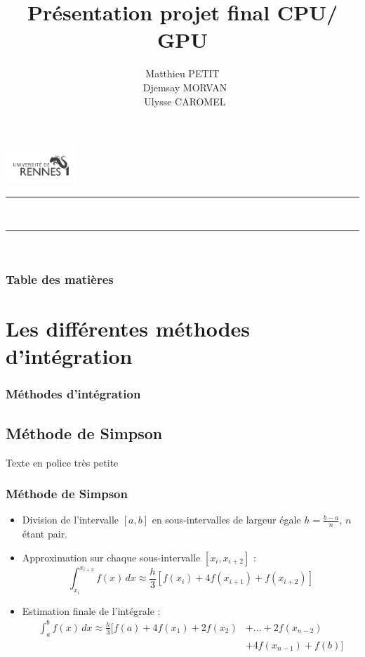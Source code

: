 \documentclass[10pt]{beamer}
\title{Présentation projet final CPU/ GPU}
\author{Matthieu PETIT \\ Djemsay MORVAN \\ Ulysse CAROMEL}
\begin{document}
\begin{frame}
    \includegraphics[width=0.2\textwidth]{../Images/univ-rennes1.png}
    \rule{\linewidth}{0.3mm} \\[0.4cm]
    \titlepage
    \rule{\linewidth}{0.3mm} \\[0.4cm]
\end{frame}

\begin{frame}
    \frametitle[Table des matières]{Table des matières}
    \tableofcontents
\end{frame}

\section{Les différentes méthodes d'intégration}

\begin{frame}
    \frametitle{Méthodes d'intégration}  
    \tableofcontents[currentsection]  
\end{frame}

\subsection{Méthode de Simpson}


\begin{frame}
    {\fontsize{4}{5}\selectfont Texte en police très petite}

    \frametitle{Méthode de Simpson}

    \begin{itemize}
        \item Division de l'intervalle $[a, b]$ en sous-intervalles de largeur égale $h = \frac{b - a}{n}$, $n$ étant pair.
        
        \item Approximation sur chaque sous-intervalle $[x_i, x_{i+2}]$ :
            \[
            \int_{x_i}^{x_{i+2}} f(x) \,dx \approx \frac{h}{3} \left[ f(x_i) + 4f(x_{i+1}) + f(x_{i+2}) \right]
            \]
        
        \item Estimation finale de l'intégrale :
            \begin{align*}
                \int_{a}^{b} f(x) \,dx \approx \frac{h}{3} \Big [ f(a) + 4f(x_1) + 2f(x_2) &+ \ldots + 2f(x_{n-2})  \\
                &+ 4f(x_{n-1}) + f(b) \Big ]
            \end{align*}
    \end{itemize}
    
\end{frame}
\end{document}
